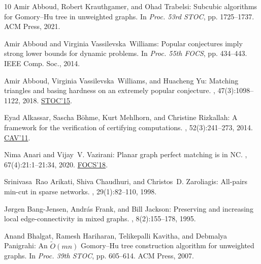 \begin{thebibliography}{10}
{\sc Amir Abboud, Robert Krauthgamer, and Ohad Trabelsi}: Subcubic algorithms
  for {G}omory--{H}u tree in unweighted graphs.
\newblock In {\em Proc. 53rd STOC}, pp. 1725--1737. ACM Press, 2021.
\newblock [\epfmtdoi{10.1145/3406325.3451073}]

{\sc Amir Abboud and Virginia Vassilevska~Williams}: Popular conjectures imply
  strong lower bounds for dynamic problems.
\newblock In {\em Proc. 55th FOCS}, pp. 434--443. IEEE Comp. Soc., 2014.

{\sc Amir Abboud, Virginia Vassilevska~Williams, and Huacheng Yu}: Matching
  triangles and basing hardness on an extremely popular conjecture.
, 47(3):1098--1122, 2018.
\newblock \prelim \href{https://doi.org/10.1145/2746539.2746594}{STOC'15}.

{\sc Eyad Alkassar, Sascha B{\"o}hme, Kurt Mehlhorn, and Christine Rizkallah}:
  A framework for the verification of certifying computations.
, 52(3):241--273, 2014.
\newblock \prelim \href{https://doi.org/10.1007/978-3-642-22110-1\_7}{CAV'11}.
\newblock [\epfmtdoi{10.1007/s10817-013-9289-2}]

{\sc Nima Anari and Vijay~V. Vazirani}: Planar graph perfect matching is in
  {NC}.
, 67(4):21:1--21:34, 2020.
\newblock \prelim \href{https://doi.org/10.1109/FOCS.2018.00068}{FOCS'18}.
\newblock [\epfmtdoi{10.1145/3397504}]

{\sc Srinivasa~Rao Arikati, Shiva Chaudhuri, and Christos~D. Zaroliagis}:
  All-pairs min-cut in sparse networks.
, 29(1):82--110, 1998.

{\sc J{\o}rgen {Bang-Jensen}, Andr{\'a}s Frank, and Bill Jackson}: Preserving
  and increasing local edge-connectivity in mixed graphs.
, 8(2):155--178, 1995.
\newblock [\epfmtdoi{10.1137/S0036142993226983}]

{\sc Anand Bhalgat, Ramesh Hariharan, Telikepalli Kavitha, and Debmalya
  Panigrahi}: An {${\widetilde O}(mn)$} {G}omory--{H}u tree construction
  algorithm for unweighted graphs.
\newblock In {\em Proc. 39th STOC}, pp. 605--614. ACM Press, 2007.
\newblock [\epfmtdoi{10.1145/1250790.1250879}]


\end{thebibliography}
